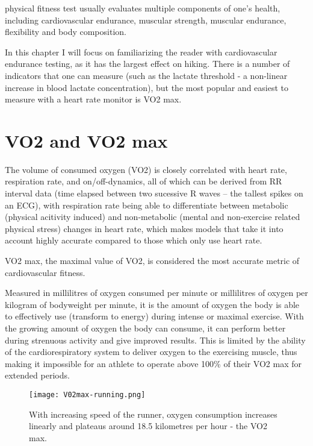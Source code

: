  physical fitness test usually evaluates multiple components of one's health, including cardiovascular endurance, muscular strength, muscular endurance, flexibility and body composition.

In this chapter I will focus on familiarizing the reader with cardiovascular endurance testing, as it has the largest effect on hiking.
There is a number of indicators that one can measure (such as the lactate threshold - a non-linear increase in blood lactate concentration\cite{lactate-threshold}), 
but the most popular and easiest to measure with a heart rate monitor is VO2 max.

\section{VO2 and VO2 max}

The volume of consumed oxygen (VO2) is closely correlated with heart rate, respiration rate, and on/off-dynamics, all of which can be derived from RR interval data (time elapsed between two sucessive R waves -- the tallest spikes on an ECG),
with respiration rate being able to differentiate between metabolic (physical acitivity induced) and non-metabolic (mental and non-exercise related physical stress) changes in heart rate,
which makes models that take it into account highly accurate compared to those which only use heart rate.\cite{vo2-hr-firstbeat}

VO2 max, the maximal value of VO2, is considered the most accurate metric of cardiovascular fitness.

Measured in millilitres of oxygen consumed per minute or millilitres of oxygen per kilogram of bodyweight per minute, it is the amount of oxygen the body is able to effectively use (transform to energy) during intense or maximal exercise.
With the growing amount of oxygen the body can consume, it can perform better during strenuous activity and give improved results.\cite{vo2max-definition}
This is limited by the ability of the cardiorespiratory system to deliver oxygen to the exercising muscle, thus making it impossible for an athlete to operate above 100\% of their VO2 max for extended periods.\cite{vo2max-oxygen-delivery}

\begin{figure}[h]
    \texttt{[image: V02max-running.png]}
    \caption{With increasing speed of the runner, oxygen consumption increases linearly and plateaus around 18.5 kilometres per hour - the VO2 max. \cite{vo2max-speed-img}}
\end{figure}

